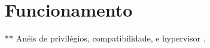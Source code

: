\section{Funcionamento}
\label{section:funcionamentovirt}

** Anéis de privilégios, compatibilidade, e hypervisor \cite{goncalves2009}.




%

